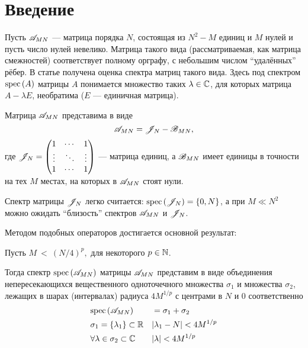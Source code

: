 \section{Введение}

Пусть \( \mathscr{A}_{{M}{N}} \) --- матрица порядка \( N \),
состоящая из \( N^2 - M \) единиц и \( M \) нулей
и пусть число нулей невелико.
Матрица такого вида (рассматриваемая, как матрица смежностей) соответствует
полному орграфу, с небольшим числом ``удалённых'' рёбер.
В статье получена оценка спектра
матриц такого вида.
Здесь под спектром \( \mathrm{spec}\left({A}\right) \) матрицы \( A \)
понимается множество таких \( \lambda\in\mathbb{C} \), для которых
матрица \( A - \lambda E \), необратима (\( E \) --- единичная матрица).

Матрица \( \mathscr{A}_{{M}{N}} \) представима в виде
\[
    \mathscr{A}_{{M}{N}} = \mathscr{J}_{N} - \mathscr{B}_{{M}{N}},
    \]
где \(
\mathscr{J}_{N} =
\begin{pmatrix}1 & \cdots & 1 \\
\vdots & \ddots & \vdots \\
1 & \cdots & 1
\end{pmatrix} \) --- матрица единиц,
а \( \mathscr{B}_{{M}{N}} \) имеет единицы в точности на тех \( M \)
местах, на которых в \( \mathscr{A}_{{M}{N}} \) стоят нули.

Спектр матрицы \( \mathscr{J}_{N} \) легко считается:
\( \mathrm{spec}\left({\mathscr{J}_{N}}\right) = \left\{0, N \right\} \),
а при \( M \ll N^2 \) можно ожидать ``близость'' спектров
\( \mathscr{A}_{{M}{N}} \) и \( \mathscr{J}_{N} \).

Методом подобных операторов \cite{baskakov-harmonic}
достигается основной результат:
\begin{thm}\label{thm:almostallones-spectra}
    Пусть
    \(M~<~\displaystyle{\left(N/4\right)^p}, \)
    для некоторого \( p\in\mathbb{N} \).

    Тогда спектр \( \mathrm{spec}\left({\mathscr{A}_{{M}{N}}}\right) \)
    матрицы \( \mathscr{A}_{{M}{N}} \)
    представим в виде объединения непересекающихся
    вещественного одноточечного множества \( \sigma_1 \)
    и множества \( \sigma_2 \),
    лежащих в шарах (интервалах) радиуса \( 4M^{1/p} \)
    с центрами в \( N \) и \( 0 \) соответственно
    \begin{equation}\begin{aligned}
        & \mathrm{spec}\left({ \mathscr{A}_{{M}{N}} }\right) &&=
        \sigma_1 + \sigma_2 \\
        & \sigma_1 = \left\{\lambda_1\right\} \subset\mathbb{R}
                   && \lvert\lambda_1 - N\rvert < 4M^{1/p} \\
        & \forall \lambda\in\sigma_2 \subset\mathbb{C}
                   && \lvert\lambda\rvert < 4M^{1/p}
    \end{aligned}\end{equation}
\end{thm}

